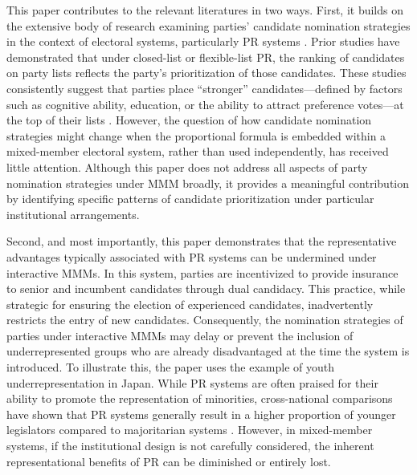 \documentclass[a4paper, 11pt]{article}
\begin{document}
This paper contributes to the relevant literatures in two ways. First, it builds on the extensive body of research examining parties' candidate nomination strategies in the context of electoral systems, particularly PR systems \citep{andrePartyNominationStrategies2017, buisseretPartyNominationStrategies2022, crutzenModelTeamContest2020, dancygierElectoralRulesElectoral2014, hoboltSelectionSanctioningEuropean2011, nemotoLocalismCoordinationThree2013}. Prior studies have demonstrated that under closed-list or flexible-list PR, the ranking of candidates on party lists reflects the party’s prioritization of those candidates. These studies consistently suggest that parties place “stronger” candidates—defined by factors such as cognitive ability, education, or the ability to attract preference votes—at the top of their lists \citep{buisseretPartyNominationStrategies2022, coxMoralHazardElectoral2021}. However, the question of how candidate nomination strategies might change when the proportional formula is embedded within a mixed-member electoral system, rather than used independently, has received little attention. Although this paper does not address all aspects of party nomination strategies under MMM broadly, it provides a meaningful contribution by identifying specific patterns of candidate prioritization under particular institutional arrangements. 

Second, and most importantly, this paper demonstrates that the representative advantages typically associated with PR systems can be undermined under interactive MMMs. In this system, parties are incentivized to provide insurance to senior and incumbent candidates through dual candidacy. This practice, while strategic for ensuring the election of experienced candidates, inadvertently restricts the entry of new candidates. Consequently, the nomination strategies of parties under interactive MMMs may delay or prevent the inclusion of underrepresented groups who are already disadvantaged at the time the system is introduced. To illustrate this, the paper uses the example of youth underrepresentation in Japan. While PR systems are often praised for their ability to promote the representation of minorities, cross-national comparisons have shown that PR systems generally result in a higher proportion of younger legislators compared to majoritarian systems \citep{stockemerAgeRepresentationParliaments2018, stockemerAgeInequalitiesPolitical2023}. However, in mixed-member systems, if the institutional design is not carefully considered, the inherent representational benefits of PR can be diminished or entirely lost.
\end{document}
